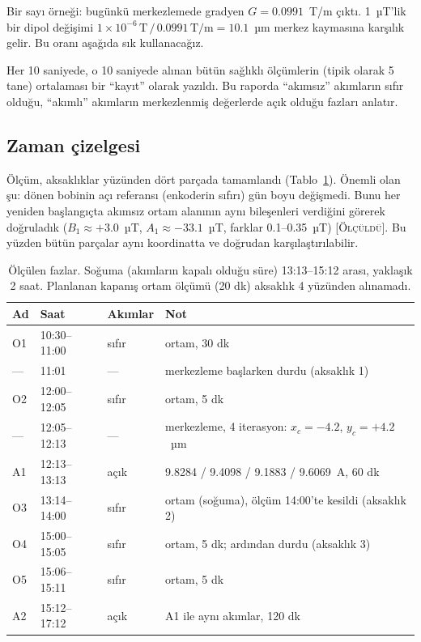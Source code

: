 \documentclass[11pt,a4paper]{article}
\newcommand{\olc}{\textsc{[Ölçüldü]}}
\begin{document}
Bir sayı örneği: bugünkü merkezlemede gradyen $G = 0.0991$~T/m çıktı. 1~µT'lik bir dipol değişimi
$1\times10^{-6}\,\text{T} \,/\, 0.0991\,\text{T/m} = 10.1$~µm merkez kaymasına karşılık gelir. Bu oranı
aşağıda sık kullanacağız.

Her 10 saniyede, o 10 saniyede alınan bütün sağlıklı ölçümlerin (tipik olarak 5 tane) ortalaması bir
``kayıt'' olarak yazıldı. Bu raporda ``akımsız'' akımların sıfır olduğu, ``akımlı'' akımların
merkezlenmiş değerlerde açık olduğu fazları anlatır.

\subsection{Zaman çizelgesi}
Ölçüm, aksaklıklar yüzünden dört parçada tamamlandı (Tablo~\ref{tab:fazlar}). Önemli olan şu: dönen bobinin
açı referansı (enkoderin sıfırı) gün boyu değişmedi. Bunu her yeniden başlangıçta akımsız ortam alanının
aynı bileşenleri verdiğini görerek doğruladık ($B_1 \approx +3.0$~µT, $A_1 \approx -33.1$~µT, farklar
0.1--0.35~µT) \olc. Bu yüzden bütün parçalar aynı koordinatta ve doğrudan karşılaştırılabilir.

\begin{table}[h]
\centering\small
\begin{tabular}{llll}
\toprule
Ad & Saat & Akımlar & Not \\
\midrule
O1 & 10:30--11:00 & sıfır & ortam, 30 dk \\
--- & 11:01 & --- & merkezleme başlarken durdu (aksaklık 1) \\
O2 & 12:00--12:05 & sıfır & ortam, 5 dk \\
--- & 12:05--12:13 & --- & merkezleme, 4 iterasyon: $x_c=-4.2$, $y_c=+4.2$~µm \\
A1 & 12:13--13:13 & açık & 9.8284 / 9.4098 / 9.1883 / 9.6069~A, 60 dk \\
O3 & 13:14--14:00 & sıfır & ortam (soğuma), ölçüm 14:00'te kesildi (aksaklık 2) \\
O4 & 15:00--15:05 & sıfır & ortam, 5 dk; ardından durdu (aksaklık 3) \\
O5 & 15:06--15:11 & sıfır & ortam, 5 dk \\
A2 & 15:12--17:12 & açık & A1 ile aynı akımlar, 120 dk \\
\bottomrule
\end{tabular}
\caption{Ölçülen fazlar. Soğuma (akımların kapalı olduğu süre) 13:13--15:12 arası, yaklaşık 2 saat.
Planlanan kapanış ortam ölçümü (20 dk) aksaklık 4 yüzünden alınamadı.}
\label{tab:fazlar}
\end{table}
\end{document}
